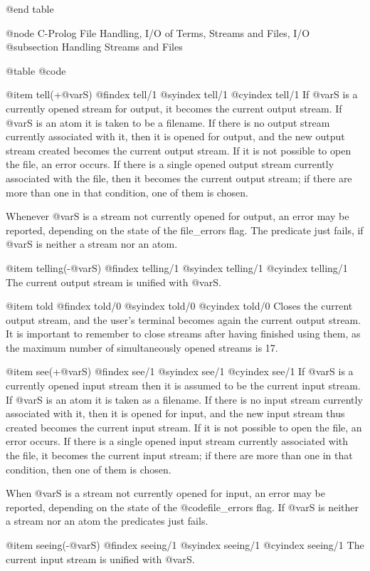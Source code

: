 {{{{{{@end table

@node C-Prolog File Handling, I/O of Terms, Streams and Files, I/O
@subsection Handling Streams and Files

@table @code

@item tell(+@var{S})
@findex tell/1
@syindex tell/1
@cyindex tell/1
If @var{S} is a currently opened stream for output, it becomes the
current output stream. If @var{S} is an atom it is taken to be a
filename.  If there is no output stream currently associated with it,
then it is opened for output, and the new output stream created becomes
the current output stream. If it is not possible to open the file, an
error occurs.  If there is a single opened output stream currently
associated with the file, then it becomes the current output stream; if
there are more than one in that condition, one of them is chosen.

Whenever @var{S} is a stream not currently opened for output, an error
may be reported, depending on the state of the file_errors flag. The
predicate just fails, if @var{S} is neither a stream nor an atom.

@item telling(-@var{S})
@findex telling/1
@syindex telling/1
@cyindex telling/1
The current output stream is unified with @var{S}.

@item told
@findex told/0
@syindex told/0
@cyindex told/0
Closes the current output stream, and the user's terminal becomes again
the current output stream. It is important to remember to close streams
after having finished using them, as the maximum number of
simultaneously opened streams is 17.

@item see(+@var{S})
@findex see/1
@syindex see/1
@cyindex see/1
If @var{S} is a currently opened input stream then it is assumed to be
the current input stream. If @var{S} is an atom it is taken as a
filename. If there is no input stream currently associated with it, then
it is opened for input, and the new input stream thus created becomes
the current input stream. If it is not possible to open the file, an
error occurs.  If there is a single opened input stream currently
associated with the file, it becomes the current input stream; if there
are more than one in that condition, then one of them is chosen.

When @var{S} is a stream not currently opened for input, an error may be
reported, depending on the state of the @code{file_errors} flag. If
@var{S} is neither a stream nor an atom the predicates just fails.

@item seeing(-@var{S})
@findex seeing/1
@syindex seeing/1
@cyindex seeing/1
The current input stream is unified with @var{S}.

}}}}}}
